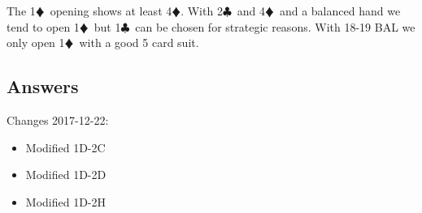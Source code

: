\documentclass[a4paper]{article}
\newcommand{\BC}{\textcolor{OliveGreen}{$\clubsuit$}}
\newcommand{\BD}{\textcolor{RedOrange}{$\vardiamondsuit$}}
\begin{document}
The 1\BD\ opening shows at least 4\BD . With 2\BC\ and 4\BD\ and a balanced hand we
tend to open 1\BD\ but 1\BC\ can be chosen for strategic reasons. With 18-19 BAL
we only open 1\BD\ with a good 5 card suit.
\bigbreak
\subsection{Answers}

Changes 2017-12-22:
\bigbreak
\begin{itemize}
\item Modified 1D-2C

\item Modified 1D-2D

\item Modified 1D-2H

\end{itemize}
\bigbreak
\
\end{document}
